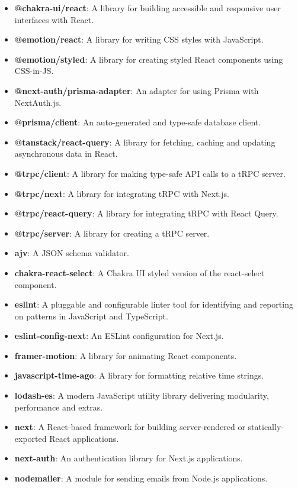 \begin{itemize}
    \item \textbf{@chakra-ui/react}: A library for building accessible and responsive user interfaces with React.
    \item \textbf{@emotion/react}: A library for writing CSS styles with JavaScript.
    \item \textbf{@emotion/styled}: A library for creating styled React components using CSS-in-JS.
    \item \textbf{@next-auth/prisma-adapter}: An adapter for using Prisma with NextAuth.js.
    \item \textbf{@prisma/client}: An auto-generated and type-safe database client.
    \item \textbf{@tanstack/react-query}: A library for fetching, caching and updating asynchronous data in React.
    \item \textbf{@trpc/client}: A library for making type-safe API calls to a tRPC server.
    \item \textbf{@trpc/next}: A library for integrating tRPC with Next.js.
    \item \textbf{@trpc/react-query}: A library for integrating tRPC with React Query.
    \item \textbf{@trpc/server}: A library for creating a tRPC server.
    \item \textbf{ajv}: A JSON schema validator.
    \item \textbf{chakra-react-select}: A Chakra UI styled version of the react-select component.
    \item \textbf{eslint}: A pluggable and configurable linter tool for identifying and reporting on patterns in JavaScript and TypeScript.
    \item \textbf{eslint-config-next}: An ESLint configuration for Next.js.
    \item \textbf{framer-motion}: A library for animating React components.
    \item \textbf{javascript-time-ago}: A library for formatting relative time strings.
    \item \textbf{lodash-es}: A modern JavaScript utility library delivering modularity, performance and extras.
    \item \textbf{next}: A React-based framework for building server-rendered or statically-exported React applications.
    \item \textbf{next-auth}: An authentication library for Next.js applications.
    \item \textbf{nodemailer}: A module for sending emails from Node.js applications.

\end{itemize}
